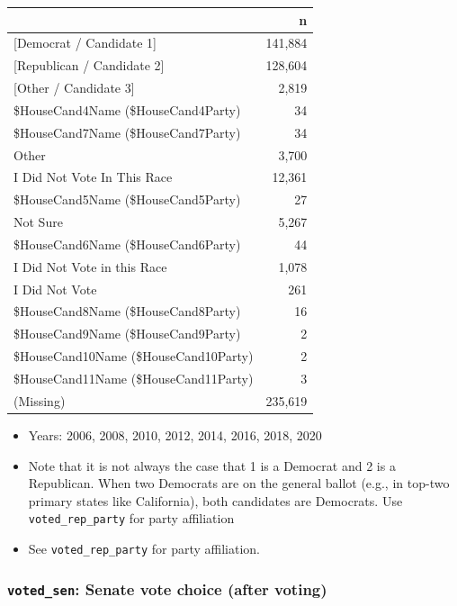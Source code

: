 \documentclass[10pt,article,oneside]{memoir}
\theoremstyle{definition}
\begin{document}
\begin{table}[H]
\centering
\begin{tabular}[t]{lr}
\toprule
 & n\\
\midrule
{}{[Democrat / Candidate 1]} & 141,884\\
{}{[Republican / Candidate 2]} & 128,604\\
{}{[Other / Candidate 3]} & 2,819\\
\$HouseCand4Name (\$HouseCand4Party) & 34\\
\$HouseCand7Name (\$HouseCand7Party) & 34\\
Other & 3,700\\
I Did Not Vote In This Race & 12,361\\
\$HouseCand5Name (\$HouseCand5Party) & 27\\
Not Sure & 5,267\\
\$HouseCand6Name (\$HouseCand6Party) & 44\\
I Did Not Vote in this Race & 1,078\\
I Did Not Vote & 261\\
\$HouseCand8Name (\$HouseCand8Party) & 16\\
\$HouseCand9Name (\$HouseCand9Party) & 2\\
\$HouseCand10Name (\$HouseCand10Party) & 2\\
\$HouseCand11Name (\$HouseCand11Party) & 3\\
(Missing) & 235,619\\
\bottomrule
\end{tabular}
\end{table}

\begin{itemize}
\tightlist
\item
  Years: 2006, 2008, 2010, 2012, 2014, 2016, 2018, 2020
\item
  Note that it is not always the case that 1 is a Democrat and 2 is a
  Republican. When two Democrats are on the general ballot (e.g., in
  top-two primary states like California), both candidates are
  Democrats. Use \texttt{voted\_rep\_party} for party affiliation
\item
  See \texttt{voted\_rep\_party} for party affiliation.
\end{itemize}

\hypertarget{voted_sen-senate-vote-choice-after-voting}{%
\subsubsection{\texorpdfstring{\texttt{voted\_sen}: Senate vote choice
(after
voting)}{voted\_sen: Senate vote choice (after voting)}}\label{voted_sen-senate-vote-choice-after-voting}}
\end{document}
